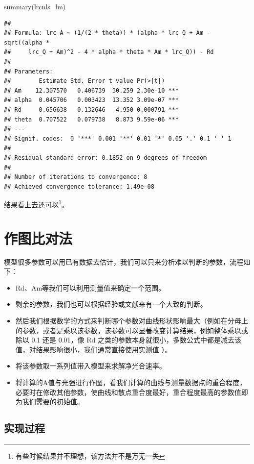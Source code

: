 \documentclass[
]{krantz}
\makeatletter
\newenvironment{Shaded}{\begin{snugshade}}{\end{snugshade}}
\newcommand{\FunctionTok}[1]{\textcolor[rgb]{0.00,0.00,0.00}{#1}}
\newcommand{\NormalTok}[1]{#1}
\providecommand{\tightlist}{%
  \setlength{\itemsep}{0pt}\setlength{\parskip}{0pt}}
\newenvironment{kframe}{%
\medskip{}
\setlength{\fboxsep}{.8em}
 \def\at@end@of@kframe{}%
 \ifinner\ifhmode%
  \def\at@end@of@kframe{\end{minipage}}%
  \begin{minipage}{\columnwidth}%
 \fi\fi%
 \def\FrameCommand##1{\hskip\@totalleftmargin \hskip-\fboxsep
 \colorbox{shadecolor}{##1}\hskip-\fboxsep
     \hskip-\linewidth \hskip-\@totalleftmargin \hskip\columnwidth}%
 \MakeFramed {\advance\hsize-\width
   \@totalleftmargin\z@ \linewidth\hsize
   \@setminipage}}%
 {\par\unskip\endMakeFramed%
 \at@end@of@kframe}
\renewenvironment{Shaded}{\begin{kframe}}{\end{kframe}}
\makeatother
\begin{document}
\begin{Shaded}
\begin{Highlighting}[]
\FunctionTok{summary}\NormalTok{(lrcnls\_lm)}
\end{Highlighting}
\end{Shaded}

\begin{verbatim}
## 
## Formula: lrc_A ~ (1/(2 * theta)) * (alpha * lrc_Q + Am - sqrt((alpha * 
##     lrc_Q + Am)^2 - 4 * alpha * theta * Am * lrc_Q)) - Rd
## 
## Parameters:
##        Estimate Std. Error t value Pr(>|t|)    
## Am    12.307570   0.406739  30.259 2.30e-10 ***
## alpha  0.045706   0.003423  13.352 3.09e-07 ***
## Rd     0.656638   0.132646   4.950 0.000791 ***
## theta  0.707522   0.079738   8.873 9.59e-06 ***
## ---
## Signif. codes:  0 '***' 0.001 '**' 0.01 '*' 0.05 '.' 0.1 ' ' 1
## 
## Residual standard error: 0.1852 on 9 degrees of freedom
## 
## Number of iterations to convergence: 8 
## Achieved convergence tolerance: 1.49e-08
\end{verbatim}

结果看上去还可以\footnote{有些时候结果并不理想，该方法并不是万无一失}。

\hypertarget{plot_comp}{%
\section{作图比对法}\label{plot_comp}}

模型很多参数可以用已有数据去估计，我们可以只来分析难以判断的参数，流程如下：

\begin{itemize}
\tightlist
\item
  Rd、Am等我们可以利用测量值来确定一个范围。
\item
  剩余的参数，我们也可以根据经验或文献来有一个大致的判断。
\item
  然后我们根据数学的方式来判断哪个参数对曲线形状影响最大（例如在分母上的参数，或者是乘以该参数，该参数可以显著改变计算结果，例如整体乘以或除以 0.1 还是 0.01，像 Rd 之类的参数本身就很小，多数公式中都是减去该值，对结果影响很小，我们通常直接使用实测值 ）。
\item
  将该参数取一系列值带入模型来求解净光合速率。
\item
  将计算的A值与光强进行作图，看我们计算的曲线与测量数据点的重合程度，必要时在修改其他参数，使曲线和散点重合度最好，重合程度最高的参数值即为我们需要的初始值。
\end{itemize}

\hypertarget{plot_exam}{%
\subsection{实现过程}\label{plot_exam}}
\end{document}
